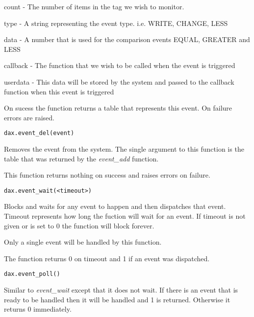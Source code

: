 count - The number of items in the tag we wish to monitor.

type - A string representing the event type.  i.e. WRITE, CHANGE, LESS

data - A number that is used for the comparison events EQUAL, GREATER and LESS

callback - The function that we wish to be called when the event is triggered

userdata - This data will be stored by the system and passed to the callback function when this event is triggered

On sucess the function returns a table that represents this event.  On failure errors are raised.

\begin{verbatim}
dax.event_del(event)
\end{verbatim}
Removes the event from the system.  The single argument to this function is the table that was returned by the \textit{event\_add} function.  

This function returns nothing on success and raises errors on failure.

\begin{verbatim}
dax.event_wait(<timeout>)
\end{verbatim}
Blocks and waits for any event to happen and then dispatches that event.  Timeout represents how long the fuction will wait for an event.  If timeout is not given or is set to 0 the function will block forever.

Only a single event will be handled by this function.

The function returns 0 on timeout and 1 if an event was dispatched.

\begin{verbatim}
dax.event_poll()
\end{verbatim}
Similar to \textit{event\_wait} except that it does not wait.  If there is an event that is ready to be handled then it will be handled and 1 is returned.  Otherwise it returns 0 immediately.